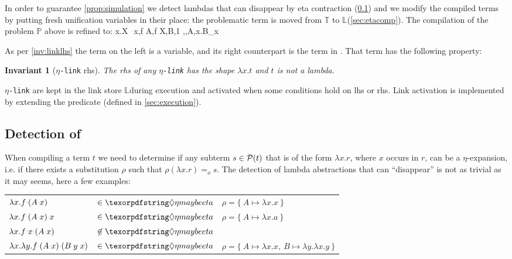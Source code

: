 \documentclass[sigconf,natbib=false,review]{acmart}
\newtheorem{invariant}{Invariant}
\newcommand{\appsep}{\ensuremath{\textcolor{lightgray}{\cdot}}}
\newcommand{\EqualRel}{\ensuremath{=}}
\newcommand{\Eo}{\ensuremath{\EqualRel_o}\xspace}
\newcommand{\linkMacro}[1]{\ensuremath{#1}\texttt{-link}\xspace}
\newcommand{\linketa} {\linkMacro{\eta}}
\newcommand{\lhs}{lhs\xspace}
\newcommand{\rhs}{rhs\xspace}
\newcommand{\linkStore}{\texorpdfstring{\ensuremath{\mathbb{L}}\xspace}{L}}
\newcommand{\foUnifPb}{\ensuremath{\mathbb{P}}\xspace}
\newcommand{\hoUnifPb}{\ensuremath{\mathbb{T}}\xspace}
\begin{document}
In order to guarantee \cref{prop:simulation} we detect
lambdas that can disappear by eta contraction (\cref{sec:etadetection}) and
we modify the compiled terms by putting fresh unification variables
in their place: the problematic term is moved 
from  \hoUnifPb to \linkStore (\cref{sec:etacomp}). The compilation
of the problem \foUnifPb above is refined to: 
%
\printAlll
  {{{\lambda x.X \appsep x,f}}}
  {{{A,f}}}
  {{{X,B,1}}}
  {{{\eta,,A,\lambda x.B_x}}}

\noindent
As per \cref{inv:linklhs} the term on the left is a variable, and its
right counterpart is the
term in \maybeeta. That term has the following property:

\begin{invariant}[\linketa \rhs]
  The \rhs of any \linketa %
  has the shape $\lambda x.t$
  and $t$ is not a lambda. 
  \label{inv:link-eta-right}
\end{invariant}

\linketa are kept in the link store \linkStore during execution
and activated when some conditions hold on \lhs or \rhs.
Link activation is implemented by extending the 
predicate (defined in \cref{sec:execution}).

\subsection{Detection of \maybeeta}\label{sec:etadetection}

When compiling a term $t$ we need to determine if any
subterm $s \in \mathcal{P}(t)$ that is of the form $\lambda x. r$,
where $x$ occurs in $r$, can be a $\eta$-expansion, i.e. if
there exists a substitution $\rho$ such that $\rho (\lambda x.r) \Eo s$.
The detection of lambda abstractions that can ``disappear''
is not as trivial as it may seems, here a few examples:
%
\begin{center}
  \begin{tabular}{lll}
    $\lambda x. f \appsep (A \appsep x)$ & $\in\maybeeta$ & $\rho = \{~ A \mapsto \lambda x.x ~\}$ \\
    $\lambda x. f \appsep (A \appsep x) \appsep x$ & $\in\maybeeta$ & $\rho = \{~ A \mapsto \lambda x.a ~\}$\\
    $\lambda x. f \appsep x \appsep (A \appsep x)$ & $\not\in\maybeeta$ &\\
    $\lambda x. \lambda y. f \appsep (A \appsep x) \appsep (B \appsep y \appsep x)$ & $\in\maybeeta$ & $\rho = \{~ A \mapsto \lambda x.x,~ B \mapsto \lambda y.\lambda x.y ~\}$
  \end{tabular}
\end{center}
\vspace{4pt}
\end{document}
